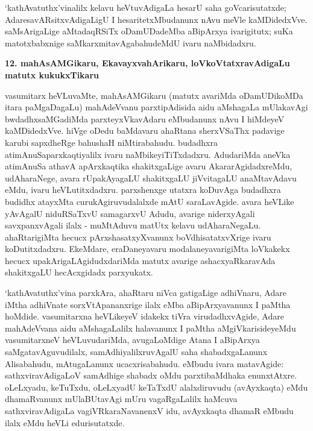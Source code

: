 `kathAvatuthx'vinalilx kelavu heVtuvAdigaLa hesarU saha goVcarisutatxde; Adare\break savARsitxvAdigaLigU I hesaritetxMbudanunx nAvu meVle kaMDidedxVve. saMsArigaLige aMtadaqRSiTx oDamUDadeMba aBipArxya ivarigitutx; suKa matotxbabxnige saMkarxmita\-vAgabahudeMdU ivaru naMbidadxru.

\begin{center}
{\textbf{\Large 12. mahAsAMGikaru, EkavayxvahArikaru, loVkoVtatxravAdigaLu matutx kukukxTikaru}}
\end{center}

vasumitarx heVLuvaMte, mahAsAMGikaru (matutx avariMda oDamUDikoMDa itara paMgaDagaLu) mahAdeVvanu parxtipAdisida aidu aMshagaLa mUlakavAgi bwdadhxsaMGadiMda parxteyxVkavAdaru eMbudanunx nAvu I hiMdeyeV kaMDidedxVve. hiVge oDedu baMdavaru ahaRtana sherxVSaThx padavige karubi sapxdheRge bahushaH niMtirabahudu. budadhxra atimAnuSaparxkaqtiyalilx ivaru naMbikeyiTiTxdadxru. AdudariMda aneVka atimAnuSa athavA apArxkaqtika shakitxgaLige avaru AkararAgidadxreMdu, udAharaNege, avara rUpakAyagaLU shakitxgaLU jiVvitagaLU anaMtavAdavu eMdu, ivaru heVLutitxdadxru. parxshenxge utatxra koDuvAga budadhxra budidhx atayxMta curukAgiruvudalalxde mAtU saraLavAgide. avara heVLike yAvAgalU niduRSaTxvU samagarxvU Adudu, avarige niderxyAgali savxpanxvAgali ilalx - muMtAduvu matUtx kelavu udAharaNegaLu. ahaRtarigiMta hecucx pArxshasatxyXvanunx boVdhisatatxvXrige ivaru koDutitxdadxru. EkeMdare, eraDaneyavaru modalaneyavarigiMta loVkakekx hecucx upakArigaLAgidudxdariMda matutx avarige ashacxyaRkaravAda shakitxgaLU hecAcxgidadx parxyukatx.

`kathAvatuthx'vina parxkAra, ahaRtaru niVca gatigaLige adhiVnaru, Adare iMtha adhiVnate sorxVtApananxrige ilalx eMba aBipArxyavanunx I paMtha hoMdide. vasumitarxna heVLikeyeV idakekx tiVra virudadhxvAgide, Adare mahAdeVvana aidu aMshagaLalilx halavanunx I paMtha aMgiVkarisideyeMdu vasumitarxneV heVLuvudariMda, avugaLoMdige Atana I aBipArxya saMgatavAguvudilalx, samAdhiyalilxruvAgalU saha shabadxgaLanunx Alisabahudu, mAtugaLanunx ucacxrisabahudu. eMbudu ivara matavAgide: sathxviravAdigaLoV samAdhige shabadx oMdu parxtibaMdhaka enunxtAtxre. oLeLxyadu, keTuTxdu, oLeLxyadU keTaTxdU alalxdiruvudu (avAyxkaqta) eMdu dhamaRvanunx mUlaBUtavAgi mUru vagaRgaLalilx haMcuva sathxviravAdigaLa vagiVRkaraNavanenxV idu, avAyxkaqta dhamaR eMbudu ilalx eMdu heVLi edurisutatxde.

